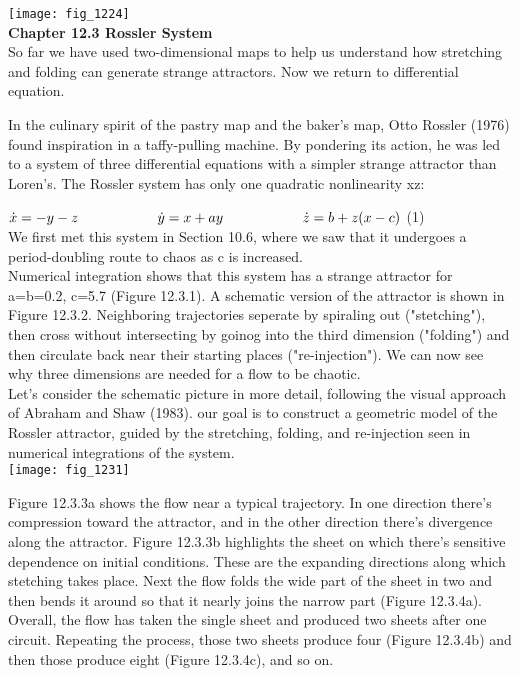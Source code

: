 \documentclass{article}
\newcommand\tab[1][1cm]{\hspace*{#1}}
\begin{document}
\texttt{[image: fig\_1224]}
\\

\textbf {Chapter 12.3 Rossler System} \\
So far we have used two-dimensional maps to help us understand how stretching and folding can generate strange attractors. Now we return to differential equation. \\ \tab

In the culinary spirit of the pastry map and the baker's map, Otto Rossler (1976) found inspiration in a taffy-pulling machine. By pondering its action, he was led to a system of three differential equations with a simpler strange attractor than Loren's. The Rossler system has only one quadratic nonlinearity xz: \\ \tab \tab

$\dot{x}=-y-z \\ \tab \tab
\dot{y}=x+ay \\ \tab \tab
\dot{z}=b+z(x-c)$ \tab (1) \\

We first met this system in Section 10.6, where we saw that it undergoes a period-doubling route to chaos as c is increased. \\ 
Numerical integration shows that this system has a strange attractor for a=b=0.2, c=5.7 (Figure 12.3.1). A schematic version of the attractor is shown in Figure 12.3.2. Neighboring trajectories seperate by spiraling out ("stetching"), then cross without intersecting by goinog into the third dimension ("folding") and then circulate back near their starting places ("re-injection"). We can now see why three dimensions are needed for a flow to be chaotic. \\ \tab
Let's consider the schematic picture in more detail, following the visual approach of Abraham and Shaw (1983). our goal is to construct a geometric model of the Rossler attractor, guided by the stretching, folding, and re-injection seen in numerical integrations of the system. \\

\texttt{[image: fig\_1231]}

\tab Figure 12.3.3a shows the flow near a typical trajectory. In one direction there's compression toward the attractor, and in the other direction there's divergence along the attractor. Figure 12.3.3b highlights the sheet on which there's sensitive dependence on initial conditions. These are the expanding directions along which stetching takes place. Next the flow folds the wide part of the sheet in two and then bends it around so that it nearly joins the narrow part (Figure 12.3.4a). Overall, the flow has taken the single sheet and produced two sheets after one circuit. Repeating the process, those two sheets produce four (Figure 12.3.4b) and then those produce eight (Figure 12.3.4c), and so on. \\
\end{document}
